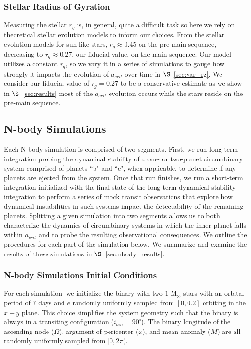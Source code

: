 \subsubsection{Stellar Radius of Gyration} \label{sec:r_g}

Measuring the stellar $r_g$ is, in general, quite a difficult task so here we rely on theoretical stellar evolution models to inform our choices.  From the \citet{Baraffe2015} stellar evolution models for sun-like stars, $r_g{\approx}0.45$ on the pre-main sequence, decreasing to $r_g{\approx}0.27$, our fiducial value, on the main sequence.  Our model utilizes a constant $r_g$, so we vary it in a series of simulations to gauge how strongly it impacts the evolution of $a_{crit}$ over time in $\S$~\ref{sec:var_rg}.  We consider our fiducial value of $r_g = 0.27$ to be a conservative estimate as we show in $\S$~\ref{sec:results} most of the $a_{crit}$ evolution occurs while the stars reside on the pre-main sequence.

\subsection{N-body Simulations}

Each N-body simulation is comprised of two segments.  First, we run long-term integration probing the dynamical stability of a one- or two-planet circumbinary system comprised of planets ``b" and ``c", when applicable, to determine if any planets are ejected from the system.  Once that run finishes, we run a short-term integration initialized with the final state of the long-term dynamical stability integration to perform a series of mock transit observations that explore how dynamical instabilities in such systems impact the detectability of the remaining planets.  Splitting a given simulation into two segments allows us to both characterize the dynamics of circumbinary systems in which the inner planet falls within $a_{crit}$ and to probe the resulting observational consequences.  We outline the procedures for each part of the simulation below.  We summarize and examine the results of these simulations in $\S$~\ref{sec:nbody_results}.

\subsubsection{N-body Simulations Initial Conditions} \label{sec:nbody_initial_conditions}

For each simulation, we initialize the binary with two $1$ M$_{\odot}$ stars with an orbital period of $7$ days and $e$ randomly uniformly sampled from $[0,0.2]$ orbiting in the $x-y$ plane.  This choice simplifies the system geometry such that the binary is always in a transiting configuration ($i_{bin} = 90^{\circ}$).  The binary longitude of the ascending node ($\Omega$), argument of pericenter ($\omega$), and mean anomaly ($M$) are all randomly uniformly sampled from $[0,2\pi)$.

